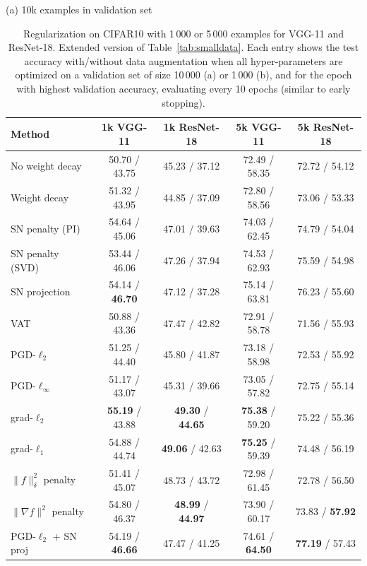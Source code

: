 \begin{table}[h]
\caption{Regularization on CIFAR10 with 1\,000 or 5\,000 examples for VGG-11 and ResNet-18.
Extended version of Table~\ref{tab:smalldata}.
Each entry shows the test accuracy with/without data augmentation when all hyper-parameters are optimized on a validation set of size 10\,000 (a) or 1\,000 (b),
and for the epoch with highest validation accuracy,
evaluating every 10 epochs (similar to early stopping).}
\centering
\vspace{0.2cm}
\label{tab:smalldata_ext}
(a) 10k examples in validation set

\begin{tabular}{ | l | c | c | c | c |  }
\hline
Method & 1k VGG-11 & 1k ResNet-18 & 5k VGG-11 & 5k ResNet-18 \\ \hline
\hline
No weight decay & 50.70 / 43.75 & 45.23 / 37.12 & 72.49 / 58.35 & 72.72 / 54.12 \\
Weight decay & 51.32 / 43.95 & 44.85 / 37.09 & 72.80 / 58.56 & 73.06 / 53.33 \\
SN penalty (PI) & 54.64 / 45.06 & 47.01 / 39.63 & 74.03 / 62.45 & 74.79 / 54.04 \\
SN penalty (SVD) & 53.44 / 46.06 & 47.26 / 37.94 & 74.53 / 62.93 & 75.59 / 54.98 \\
SN projection & 54.14 / \textbf{\color{darkgray}46.70} & 47.12 / 37.28 & 75.14 / 63.81 & 76.23 / 55.60 \\
VAT & 50.88 / 43.36 & 47.47 / 42.82 & 72.91 / 58.78 & 71.56 / 55.93 \\
PGD-$\ell_2$ & 51.25 / 44.40 & 45.80 / 41.87 & 73.18 / 58.98 & 72.53 / 55.92 \\
PGD-$\ell_\infty$ & 51.17 / 43.07 & 45.31 / 39.66 & 73.05 / 57.82 & 72.75 / 55.14 \\
grad-$\ell_2$ & \textbf{\color{darkgray}55.19} / 43.88 & \textbf{49.30} / \textbf{\color{darkgray}44.65} & \textbf{75.38} / 59.20 & 75.22 / 55.36 \\
grad-$\ell_1$ & 54.88 / 44.74 & \textbf{\color{darkgray}49.06} / 42.63 & \textbf{\color{darkgray}75.25} / 59.39 & 74.48 / 56.19 \\
\hline
$\|f\|_\delta^2$ penalty & 51.41 / 45.07 & 48.73 / 43.72 & 72.98 / 61.45 & 72.78 / 56.50 \\
$\|\nabla f\|^2$ penalty & 54.80 / 46.37 & \textbf{\color{darkgray}48.99} / \textbf{44.97} & 73.90 / 60.17 & 73.83 / \textbf{\color{darkgray}57.92} \\
PGD-$\ell_2$ + SN proj & 54.19 / \textbf{\color{darkgray}46.66} & 47.47 / 41.25 & 74.61 / \textbf{64.50} & \textbf{\color{darkgray}77.19} / 57.43 \\

\end{tabular}
\end{table}

